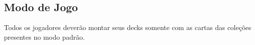 \subsection{Modo de Jogo}

Todos os jogadores deverão montar seus decks somente com as cartas das coleções presentes no modo padrão.